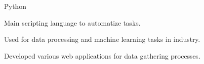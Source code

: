 \begin{cvskills}
\cvskill
{Python}
{
    \begin{cvitems}
    \item Main scripting language to automatize tasks.
    \item Used for data processing and machine learning tasks in industry.
    \item Developed various web applications for data gathering processes.
    \end{cvitems}
}
\vspace{-.5cm}
\vspace{-.5cm}

\end{cvskills}


\begin{minipage}[t]{.45\linewidth}
  \begin{cvskills}
  \end{cvskills}
\end{minipage}
\begin{minipage}[t]{.40\linewidth}
  \begin{cvskills}
  \end{cvskills}
\end{minipage}
\begin{minipage}[t]{.15\linewidth}
  \begin{cvskills}
  \end{cvskills}
\end{minipage}
